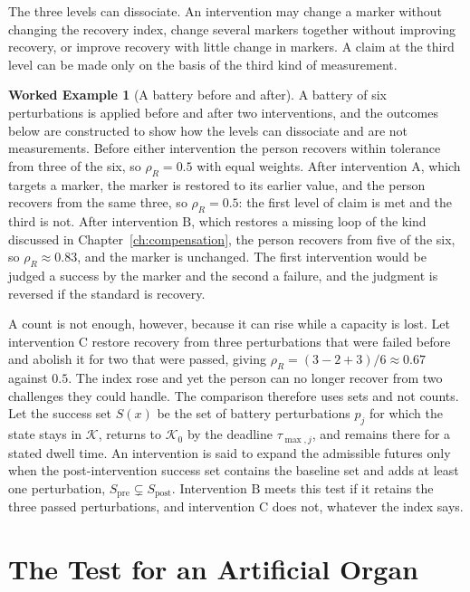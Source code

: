 \documentclass[11pt,openany]{book}
\theoremstyle{definition}
\newtheorem{example}{Worked Example}[chapter]
\theoremstyle{remark}
\newcommand{\Kset}{\mathcal{K}}
\begin{document}
The three levels can dissociate. An intervention may change a marker without changing the recovery index, change several markers together without improving recovery, or improve recovery with little change in markers. A claim at the third level can be made only on the basis of the third kind of measurement.

\begin{example}[A battery before and after]
\label{ex:battery6}
A battery of six perturbations is applied before and after two interventions, and the outcomes below are constructed to show how the levels can dissociate and are not measurements. Before either intervention the person recovers within tolerance from three of the six, so $\rho_R=0.5$ with equal weights. After intervention $\mathrm{A}$, which targets a marker, the marker is restored to its earlier value, and the person recovers from the same three, so $\rho_R=0.5$: the first level of claim is met and the third is not. After intervention $\mathrm{B}$, which restores a missing loop of the kind discussed in Chapter~\ref{ch:compensation}, the person recovers from five of the six, so $\rho_R\approx0.83$, and the marker is unchanged. The first intervention would be judged a success by the marker and the second a failure, and the judgment is reversed if the standard is recovery.

A count is not enough, however, because it can rise while a capacity is lost. Let intervention $\mathrm{C}$ restore recovery from three perturbations that were failed before and abolish it for two that were passed, giving $\rho_R=(3-2+3)/6\approx0.67$ against $0.5$. The index rose and yet the person can no longer recover from two challenges they could handle. The comparison therefore uses sets and not counts. Let the success set $S(x)$ be the set of battery perturbations $p_j$ for which the state stays in $\Kset$, returns to $\Kset_0$ by the deadline $\tau_{\max,j}$, and remains there for a stated dwell time. An intervention is said to expand the admissible futures only when the post-intervention success set contains the baseline set and adds at least one perturbation, $S_{\mathrm{pre}}\subsetneq S_{\mathrm{post}}$. Intervention $\mathrm{B}$ meets this test if it retains the three passed perturbations, and intervention $\mathrm{C}$ does not, whatever the index says.
\end{example}

\section{The Test for an Artificial Organ}
\end{document}
